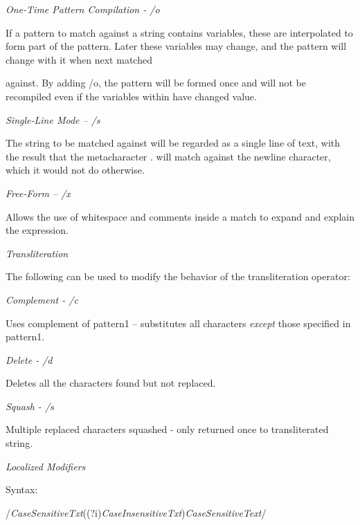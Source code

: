 \documentclass[a4paper,11pt]{book}
\begin{document}
\noindent 

\noindent \textit{One-Time Pattern Compilation - /o}

\noindent If a pattern to match against a string contains variables, these are interpolated to form part of the pattern. Later these variables may change, and the pattern will change with it when next matched

\noindent against. By adding /o, the pattern will be formed once and will not be recompiled even if the variables within have changed value.

\noindent 

\noindent \textit{Single-Line Mode -- /s}

\noindent The string to be matched against will be regarded as a single line of text, with the result that the metacharacter . will match against the newline character, which it would not do otherwise.

\noindent 

\noindent \textit{Free-Form -- /x}

\noindent Allows the use of whitespace and comments inside a match to expand and explain the expression.

\noindent 

\noindent \textit{Transliteration}

\noindent The following can be used to modify the behavior of the transliteration operator:

\noindent 

\noindent \textit{Complement - /c}

\noindent Uses complement of pattern1 -- substitutes all characters \textit{except }those specified in pattern1.

\noindent 

\noindent \textit{Delete - /d}

\noindent Deletes all the characters found but not replaced.

\noindent 

\noindent \textit{Squash - /s}

\noindent Multiple replaced characters squashed - only returned once to transliterated string.

\noindent 

\noindent \textit{Localized Modifiers}

\noindent Syntax:

\noindent 

\noindent /\textit{CaseSensitiveTxt}((?i)\textit{CaseInsensitiveTxt})\textit{CaseSensitiveText}/
\end{document}
